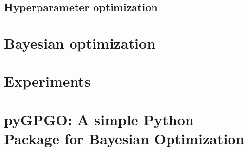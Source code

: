 \documentclass[10pt,a4paper,twoside]{book}
\begin{document}
\section{Hyperparameter optimization}

\chapter{Bayesian optimization}
\chapter{Experiments}
\chapter{pyGPGO: A simple Python Package for Bayesian Optimization}
\end{document}
